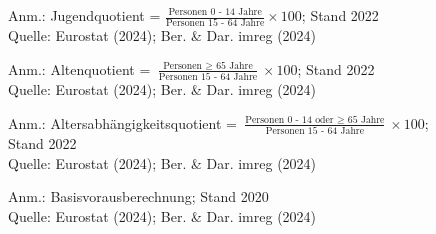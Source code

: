 \begin{figure}[p]
	{\centering {}}
	\label{map:jugend}
	\begin{spacing}{1} \scriptsize
		Anm.: Jugendquotient = $\frac{\text{Personen 0 - 14 Jahre}}{\text{Personen 15 - 64 Jahre}} \times 100$; Stand 2022\\
		Quelle: Eurostat (2024); Ber. \& Dar. imreg (2024) \end{spacing}
\end{figure}


\begin{figure}[p]
	{\centering {}}
	\label{map:alte}
	\begin{spacing}{1} \scriptsize
		Anm.: Altenquotient = $\frac{\text{Personen $\geq$ 65 Jahre}}{\text{Personen 15 - 64 Jahre}} \times 100$; Stand 2022\\
		Quelle: Eurostat (2024); Ber. \& Dar. imreg (2024) \end{spacing}
\end{figure}


\begin{figure}[p]
	{\centering {}}
	\label{map:altersabh}
	\begin{spacing}{1} \scriptsize
		Anm.: Altersabhängigkeitsquotient = $\frac{\text{Personen 0 - 14 oder $\geq$ 65 Jahre}}{\text{Personen 15 - 64 Jahre}} \times 100$; Stand 2022\\
		Quelle: Eurostat (2024); Ber. \& Dar. imreg (2024) \end{spacing}
\end{figure}


\begin{figure}[p]
	{\centering {}}
	\label{map:bevprog}
	\begin{spacing}{1} \scriptsize
		Anm.: Basisvorausberechnung; Stand 2020\\
		Quelle: Eurostat (2024); Ber. \& Dar. imreg (2024) \end{spacing}
\end{figure}

